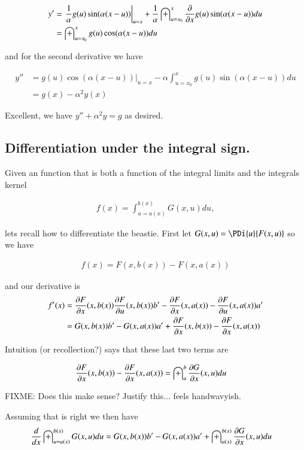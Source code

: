 \documentclass{article}
\begin{document}
\begin{align*}
y'
&=
{\left.
\frac{1}{\alpha}
g(u) \sin( \alpha(x-u) ) \right\vert}_{u=x}
+\frac{1}{\alpha} \int_{u=x_0}^x \PD{x}{} g(u) \sin( \alpha(x-u) ) du \\
&= \int_{u=x_0}^x g(u) \cos( \alpha(x-u) ) du \\
\end{align*}

and for the second derivative we have

\begin{align*}
y''
&=
{\left. g(u) \cos( \alpha(x-u) ) \right\vert}_{u=x}
- \alpha \int_{u=x_0}^x g(u) \sin( \alpha(x-u) ) du \\
&= g(x) - \alpha^2 y(x)
\end{align*}

Excellent, we have $y'' + \alpha^2 y = g$ as desired.

\subsection{ Differentiation under the integral sign. }

Given an function that is both a function of the integral limits and the integrals kernel

\begin{align*}
f(x) = \int_{u = a(x)}^{b(x)} G(x,u) du,
\end{align*}

lets recall how to differentiate the beastie.  First let $G(x,u) = \PDi{u}{F(x,u)}$ so we have

\begin{align*}
f(x) = F(x,b(x)) - F(x,a(x))
\end{align*}

and our derivative is
\begin{align*}
f'(x)
&=
\PD{x}{F}(x,b(x))
\PD{u}{F}(x,b(x)) b'
-\PD{x}{F}(x,a(x))
-\PD{u}{F}(x,a(x)) a' \\
&=
G(x,b(x)) b'
-G(x,a(x)) a'
+\PD{x}{F}(x,b(x))
-\PD{x}{F}(x,a(x))
\\
\end{align*}

Intuition (or recollection?) says that these last two terms are

\begin{align*}
\PD{x}{F}(x,b(x))
-\PD{x}{F}(x,a(x))
&=
\int_{a}^b \PD{x}{G}(x,u) du
\end{align*}

FIXME: Does this make sense?   Justify this... feels handwavyish.

Assuming that is right we then have
\begin{align}\label{eqn:diffInt}
\frac{d}{dx} \int_{u = a(x)}^{b(x)} G(x,u) du
&=
G(x,b(x)) b'
-G(x,a(x)) a'
+ \int_{a(x)}^{b(x)} \PD{x}{G}(x,u) du
\end{align}



\end{document}
